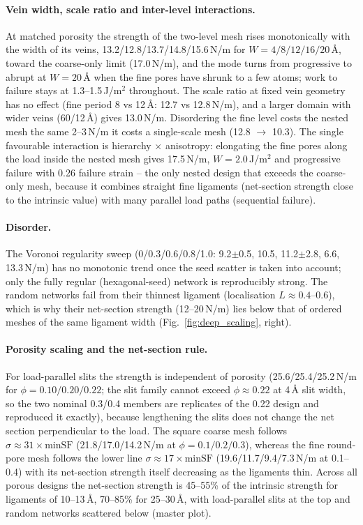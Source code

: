 \paragraph{Vein width, scale ratio and inter-level interactions.} At matched porosity the strength of the two-level mesh rises monotonically with the width of its veins, 13.2/12.8/13.7/14.8/15.6\,N/m for $W=4/8/12/16/20$\,\AA, toward the coarse-only limit (17.0\,N/m), and the mode turns from progressive to abrupt at $W=20$\,\AA{} when the fine pores have shrunk to a few atoms; work to failure stays at 1.3--1.5\,J/m$^2$ throughout. The scale ratio at fixed vein geometry has no effect (fine period 8 vs 12\,\AA: 12.7 vs 12.8\,N/m), and a larger domain with wider veins (60/12\,\AA) gives 13.0\,N/m. Disordering the fine level costs the nested mesh the same 2--3\,N/m it costs a single-scale mesh (12.8 $\to$ 10.3). The single favourable interaction is hierarchy $\times$ anisotropy: elongating the fine pores along the load inside the nested mesh gives 17.5\,N/m, $W=2.0$\,J/m$^2$ and progressive failure with 0.26 failure strain -- the only nested design that exceeds the coarse-only mesh, because it combines straight fine ligaments (net-section strength close to the intrinsic value) with many parallel load paths (sequential failure).

\paragraph{Disorder.} The Voronoi regularity sweep (0/0.3/0.6/0.8/1.0: 9.2$\pm$0.5, 10.5, 11.2$\pm$2.8, 6.6, 13.3\,N/m) has no monotonic trend once the seed scatter is taken into account; only the fully regular (hexagonal-seed) network is reproducibly strong. The random networks fail from their thinnest ligament (localisation $L\approx0.4$--0.6), which is why their net-section strength (12--20\,N/m) lies below that of ordered meshes of the same ligament width (Fig.~\ref{fig:deep_scaling}, right).

\paragraph{Porosity scaling and the net-section rule.} For load-parallel slits the strength is independent of porosity (25.6/25.4/25.2\,N/m for $\phi=0.10/0.20/0.22$; the slit family cannot exceed $\phi\approx0.22$ at 4\,\AA{} slit width, so the two nominal 0.3/0.4 members are replicates of the 0.22 design and reproduced it exactly), because lengthening the slits does not change the net section perpendicular to the load. The square coarse mesh follows $\sigma\approx31\times\mathrm{minSF}$ (21.8/17.0/14.2\,N/m at $\phi=0.1/0.2/0.3$), whereas the fine round-pore mesh follows the lower line $\sigma\approx17\times\mathrm{minSF}$ (19.6/11.7/9.4/7.3\,N/m at 0.1--0.4) with its net-section strength itself decreasing as the ligaments thin. Across all porous designs the net-section strength is 45--55\% of the intrinsic strength for ligaments of 10--13\,\AA, 70--85\% for 25--30\,\AA, with load-parallel slits at the top and random networks scattered below (master plot).

